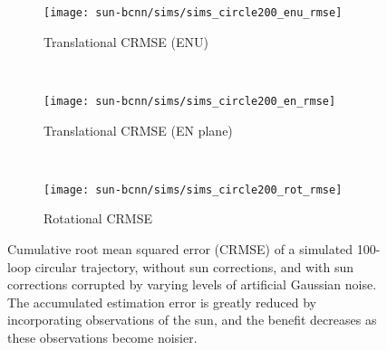 \begin{figure*}
\centering
	 \begin{subfigure}{0.42\textwidth}
	 	\vspace{-5pt}
    	\texttt{[image: sun-bcnn/sims/sims\_circle200\_enu\_rmse]}
        \caption{Translational CRMSE (ENU)}
        \label{fig:sim_traj}
    \end{subfigure}
    ~
    \begin{subfigure}{0.42\textwidth}
    	\vspace{-5pt}
    	\texttt{[image: sun-bcnn/sims/sims\_circle200\_en\_rmse]}
        \caption{Translational CRMSE (EN plane)}
        \label{fig:sim_en_rmse}
    \end{subfigure}
    ~
    \begin{subfigure}{0.42\textwidth}
    	\texttt{[image: sun-bcnn/sims/sims\_circle200\_rot\_rmse]}
        \caption{Rotational CRMSE}
        \label{fig:sim_rot_rmse}
    \end{subfigure}

\caption{Cumulative root mean squared error (CRMSE) of a simulated 100-loop circular trajectory, without sun corrections, and with sun corrections corrupted by varying levels of artificial Gaussian noise. The accumulated estimation error is greatly reduced by incorporating observations of the sun, and the benefit decreases as these observations become noisier.}
\label{fig:sim_rmse}
\end{figure*}

